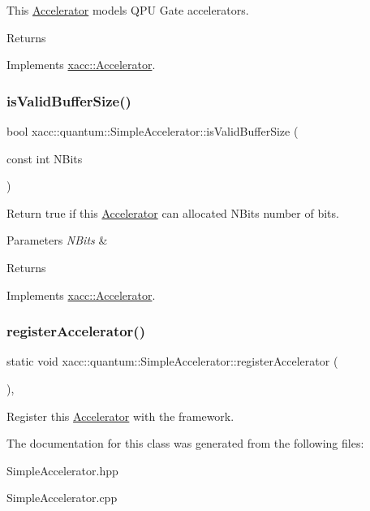 This \hyperlink{a02432}{Accelerator} models Q\+PU Gate accelerators. \begin{DoxyReturn}{Returns}

\end{DoxyReturn}


Implements \hyperlink{a02432_aaffc3e4bb9880eb5041b1b58ee4c2665}{xacc\+::\+Accelerator}.

\mbox{\label{a01244_a60b9db2d6aed235857c45413a070338e}} 
\subsubsection{\texorpdfstring{is\+Valid\+Buffer\+Size()}{isValidBufferSize()}}
{\footnotesize\ttfamily bool xacc\+::quantum\+::\+Simple\+Accelerator\+::is\+Valid\+Buffer\+Size (\begin{DoxyParamCaption}\item[{const int}]{N\+Bits }\end{DoxyParamCaption})\hspace{0.3cm}{\ttfamily [virtual]}}

Return true if this \hyperlink{a02432}{Accelerator} can allocated N\+Bits number of bits. 
\begin{DoxyParams}{Parameters}
{\em N\+Bits} & \\
\hline
\end{DoxyParams}
\begin{DoxyReturn}{Returns}

\end{DoxyReturn}


Implements \hyperlink{a02432_ae51584850faeec77299058383977ddeb}{xacc\+::\+Accelerator}.

\mbox{\label{a01244_a1cfa3381a56ca6f431b4722162ccb63d}} 
\subsubsection{\texorpdfstring{register\+Accelerator()}{registerAccelerator()}}
{\footnotesize\ttfamily static void xacc\+::quantum\+::\+Simple\+Accelerator\+::register\+Accelerator (\begin{DoxyParamCaption}{ }\end{DoxyParamCaption})\hspace{0.3cm}{\ttfamily [inline]}, {\ttfamily [static]}}

Register this \hyperlink{a02432}{Accelerator} with the framework. 

The documentation for this class was generated from the following files\+:\begin{DoxyCompactItemize}
\item 
Simple\+Accelerator.\+hpp\item 
Simple\+Accelerator.\+cpp\end{DoxyCompactItemize}
